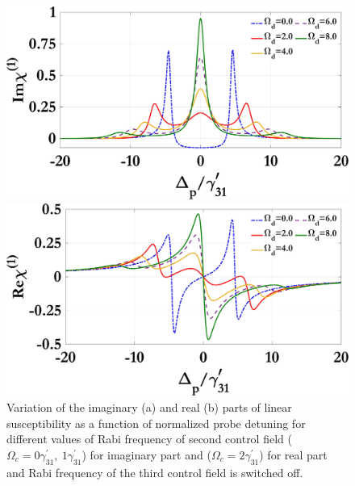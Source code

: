 \documentclass[12pt,a4paper]{article}
\begin{document}
\noindent
\begin{figure}[h]
  \centering
  \begin{minipage}[t]{0.48\textwidth}
    \centering
    \includegraphics[width=\linewidth]{Plots/Img_chi1_Omega_d.jpeg}
    \subcaption{}
  \end{minipage}%
  \hfill
  \begin{minipage}[t]{0.48\textwidth}
    \centering
    \includegraphics[width=\linewidth]{Plots/Real_chi1_Omega_d.jpeg}
    \subcaption{}
  \end{minipage}
  \caption{Variation of the imaginary (a) and real (b) parts of linear susceptibility as a function of normalized probe detuning for different values of Rabi frequency of second control field ($\Omega_c=0\gamma^{\prime}_{31},\ 1\gamma^{\prime}_{31}$) for imaginary part and ($\Omega_c=2\gamma^{\prime}_{31}$) for real part and Rabi frequency of the third control field is switched off.}
  \label{fig:omegad}
\end{figure}
\end{document}
